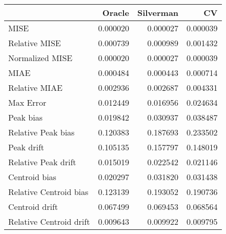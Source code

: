 \begin{tabular}{lrrr}
  \hline
 & Oracle & Silverman & CV \\ 
  \hline
MISE & 0.000020 & 0.000027 & 0.000039 \\ 
  Relative MISE & 0.000739 & 0.000989 & 0.001432 \\ 
  Normalized MISE & 0.000020 & 0.000027 & 0.000039 \\ 
  MIAE & 0.000484 & 0.000443 & 0.000714 \\ 
  Relative MIAE & 0.002936 & 0.002687 & 0.004331 \\ 
  Max Error & 0.012449 & 0.016956 & 0.024634 \\ 
  Peak bias & 0.019842 & 0.030937 & 0.038487 \\ 
  Relative Peak bias & 0.120383 & 0.187693 & 0.233502 \\ 
  Peak drift & 0.105135 & 0.157797 & 0.148019 \\ 
  Relative Peak drift & 0.015019 & 0.022542 & 0.021146 \\ 
  Centroid bias & 0.020297 & 0.031820 & 0.031438 \\ 
  Relative Centroid bias & 0.123139 & 0.193052 & 0.190736 \\ 
  Centroid drift & 0.067499 & 0.069453 & 0.068564 \\ 
  Relative Centroid drift & 0.009643 & 0.009922 & 0.009795 \\ 
   \hline
\end{tabular}
